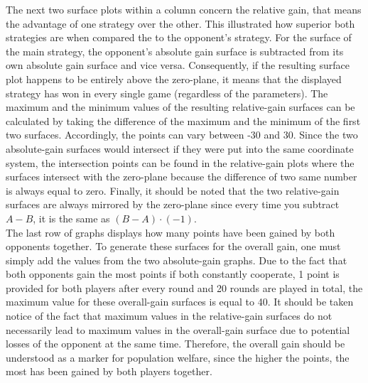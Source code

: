 \documentclass{article}
\begin{document}
The next two surface plots within a column concern the relative gain, that means the advantage of one strategy over the other. 
This illustrated how superior both strategies are when compared the to the opponent’s strategy. 
For the surface of the main strategy, the opponent’s absolute gain surface is subtracted from its own absolute gain surface and vice versa. 
Consequently, if the resulting surface plot happens to be entirely above the zero-plane, it means that the displayed strategy has won in every single game (regardless of the parameters).
The maximum and the minimum values of the resulting relative-gain surfaces can be calculated by taking the difference of the maximum and the minimum of the first two surfaces. 
Accordingly, the points can vary between -30 and 30. 
Since the two absolute-gain surfaces would intersect if they were put into the same coordinate system, the intersection points can be found in the relative-gain plots where the surfaces intersect with the zero-plane because the difference of two same number is always equal to zero. 
Finally, it should be noted that the two relative-gain surfaces are always mirrored by the zero-plane since every time you subtract $A - B$, it is the same as $(B - A) \cdot (-1)$.\\

The last row of graphs displays how many points have been gained by both opponents together. 
To generate these surfaces for the overall gain, one must simply add the values from the two absolute-gain graphs. 
Due to the fact that both opponents gain the most points if both constantly cooperate, 1 point is provided for both players after every round and 20 rounds are played in total, the maximum value for these overall-gain surfaces is equal to 40. 
It should be taken notice of the fact that maximum values in the relative-gain surfaces do not necessarily lead to maximum values in the overall-gain surface due to potential losses of the opponent at the same time. 
Therefore, the overall gain should be understood as a marker for population welfare, since the higher the points, the most has been gained by both players together.
\end{document}
